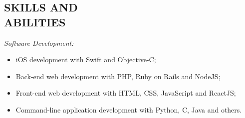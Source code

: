 \documentclass[margin]{res}
\begin{document}
\begin{resume}
		\section{SKILLS AND \\ABILITIES}
			{\sl Software Development:}
			\begin{itemize}
				\item iOS development with Swift and Objective-C;
				\item Back-end web development with PHP, Ruby on Rails and NodeJS;
				\item Front-end web development with HTML, CSS, JavaScript and ReactJS;
				\item Command-line application development with Python, C, Java and others.
	  		\end{itemize}

\end{resume}
\end{document}
